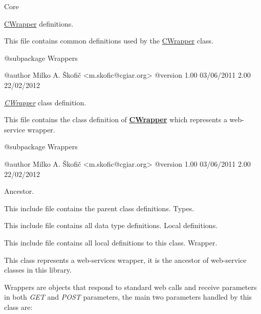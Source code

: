 Core

\hyperlink{class_c_wrapper}{C\-Wrapper} definitions.

This file contains common definitions used by the \hyperlink{class_c_wrapper}{C\-Wrapper} class.

\begin{DoxyVerb}    @subpackage     Wrappers

    @author         Milko A. Škofič <m.skofic@cgiar.org>
    @version        1.00 03/06/2011
                            2.00 22/02/2012\end{DoxyVerb}


{\itshape \hyperlink{class_c_wrapper}{C\-Wrapper}\/} class definition.

This file contains the class definition of {\bfseries \hyperlink{class_c_wrapper}{C\-Wrapper}} which represents a web-\/service wrapper.

\begin{DoxyVerb}    @subpackage     Wrappers

    @author         Milko A. Škofič <m.skofic@cgiar.org>
    @version        1.00 03/06/2011
                            2.00 22/02/2012\end{DoxyVerb}


Ancestor.

This include file contains the parent class definitions. Types.

This include file contains all data type definitions. Local definitions.

This include file contains all local definitions to this class. Wrapper.

This class represents a web-\/services wrapper, it is the ancestor of web-\/service classes in this library.

Wrappers are objects that respond to standard web calls and receive parameters in both {\itshape G\-E\-T\/} and {\itshape P\-O\-S\-T\/} parameters, the main two parameters handled by this class are\-:


